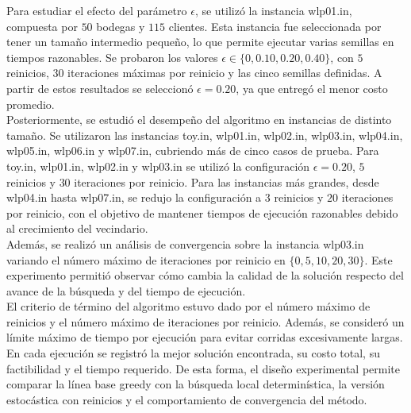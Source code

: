 \noindent Para estudiar el efecto del parámetro \(\epsilon\), se utilizó la instancia wlp01.in, compuesta por \(50\) bodegas y \(115\) clientes. Esta instancia fue seleccionada por tener un tamaño intermedio pequeño, lo que permite ejecutar varias semillas en tiempos razonables. Se probaron los valores \(\epsilon \in \{0, 0.10, 0.20, 0.40\}\), con \(5\) reinicios, \(30\) iteraciones máximas por reinicio y las cinco semillas definidas. A partir de estos resultados se seleccionó \(\epsilon = 0.20\), ya que entregó el menor costo promedio.\\

\noindent Posteriormente, se estudió el desempeño del algoritmo en instancias de distinto tamaño. Se utilizaron las instancias toy.in, wlp01.in, wlp02.in, wlp03.in, wlp04.in, wlp05.in, wlp06.in y wlp07.in, cubriendo más de cinco casos de prueba. Para toy.in, wlp01.in, wlp02.in y wlp03.in se utilizó la configuración \(\epsilon = 0.20\), \(5\) reinicios y \(30\) iteraciones por reinicio. Para las instancias más grandes, desde wlp04.in hasta wlp07.in, se redujo la configuración a \(3\) reinicios y \(20\) iteraciones por reinicio, con el objetivo de mantener tiempos de ejecución razonables debido al crecimiento del vecindario.\\

\noindent Además, se realizó un análisis de convergencia sobre la instancia wlp03.in variando el número máximo de iteraciones por reinicio en \(\{0, 5, 10, 20, 30\}\). Este experimento permitió observar cómo cambia la calidad de la solución respecto del avance de la búsqueda y del tiempo de ejecución.\\

\noindent El criterio de término del algoritmo estuvo dado por el número máximo de reinicios y el número máximo de iteraciones por reinicio. Además, se consideró un límite máximo de tiempo por ejecución para evitar corridas excesivamente largas. En cada ejecución se registró la mejor solución encontrada, su costo total, su factibilidad y el tiempo requerido. De esta forma, el diseño experimental permite comparar la línea base greedy con la búsqueda local determinística, la versión estocástica con reinicios y el comportamiento de convergencia del método.